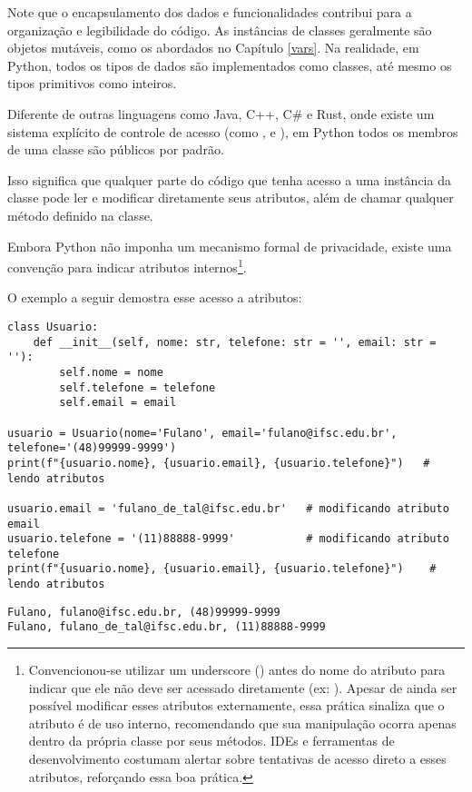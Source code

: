 Note que o encapsulamento dos dados e funcionalidades contribui para a organização e legibilidade do código.
As instâncias de classes geralmente são objetos mutáveis, como os abordados no Capítulo \ref{vars}.
Na realidade, em Python, todos os tipos de dados são implementados como classes, até mesmo os tipos primitivos como inteiros.

Diferente de outras linguagens como Java, C++, C\# e Rust, onde existe um sistema explícito de controle de
acesso (como ,  e ), em Python todos os membros
de uma classe são públicos por padrão.

Isso significa que qualquer parte do código que tenha acesso a uma instância da classe pode ler e modificar diretamente
seus atributos, além de chamar qualquer método definido na classe.

Embora Python não imponha um mecanismo formal de privacidade, existe uma convenção para indicar atributos
internos\footnote{Convencionou-se utilizar um underscore (\inlcode{_}) antes do nome do atributo para indicar que ele
não deve ser acessado diretamente (ex: ). Apesar de ainda ser possível modificar
esses atributos externamente, essa prática sinaliza que o atributo é de uso interno, recomendando que sua manipulação
ocorra apenas dentro da própria classe por seus métodos. IDEs e ferramentas de desenvolvimento costumam alertar sobre
tentativas de acesso direto a esses atributos, reforçando essa boa prática.}.



O exemplo a seguir demostra esse acesso a atributos:
\begin{verbatim}
class Usuario:
    def __init__(self, nome: str, telefone: str = '', email: str = ''):
        self.nome = nome
        self.telefone = telefone
        self.email = email

usuario = Usuario(nome='Fulano', email='fulano@ifsc.edu.br', telefone='(48)99999-9999')
print(f"{usuario.nome}, {usuario.email}, {usuario.telefone}")   # lendo atributos

usuario.email = 'fulano_de_tal@ifsc.edu.br'   # modificando atributo email
usuario.telefone = '(11)88888-9999'           # modificando atributo telefone
print(f"{usuario.nome}, {usuario.email}, {usuario.telefone}")    # lendo atributos
\end{verbatim}
\begin{verbatim}
Fulano, fulano@ifsc.edu.br, (48)99999-9999
Fulano, fulano_de_tal@ifsc.edu.br, (11)88888-9999
\end{verbatim}



